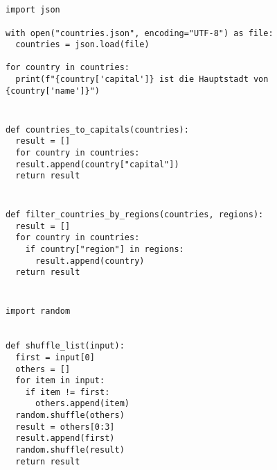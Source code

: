 \documentclass[a4paper]{article}
\begin{document}




\section{}
\begin{verbatim}
import json

with open("countries.json", encoding="UTF-8") as file:
  countries = json.load(file)

for country in countries:
  print(f"{country['capital']} ist die Hauptstadt von {country['name']}")
\end{verbatim}

\section{}
\begin{verbatim}
def countries_to_capitals(countries):
  result = []
  for country in countries:
  result.append(country["capital"])
  return result
\end{verbatim}

\section{} 
\begin{verbatim}
def filter_countries_by_regions(countries, regions):
  result = []
  for country in countries:
    if country["region"] in regions:
      result.append(country)
  return result
\end{verbatim}
\section{}
\begin{verbatim}
import random


def shuffle_list(input):
  first = input[0]
  others = []
  for item in input:
    if item != first:
      others.append(item)
  random.shuffle(others)
  result = others[0:3]
  result.append(first)
  random.shuffle(result)
  return result
\end{verbatim}
\end{document}
